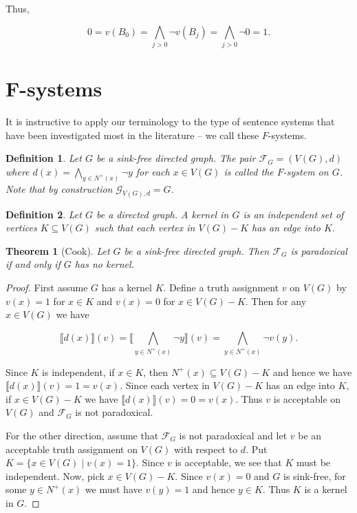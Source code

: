 \documentclass[12pt]{article}
\newtheorem{thm}{Theorem}
\newtheorem{defn}{Definition}
\theoremstyle{remark}
\newcommand{\fancy}[1]{\mathcal{#1}}
\def\G{\fancy{G}}
\def\F{\fancy{F}}
\def\F{\fancy{F}}
\begin{document}
Thus, 

\[0 = v(B_0) = \bigwedge_{j > 0} \neg v(B_j)= \bigwedge_{j > 0} \neg 0 = 1.\]


\appendix


\section{F-systems}
\label{app}

It is instructive to apply our terminology to the type of sentence systems that have been investigated most in the literature -- we call these $F$-systems.

\begin{defn}
Let $G$ be a sink-free directed graph.  The pair $\F_G = (V(G), d)$ where $d(x) = \bigwedge_{y \in N^+(x)} \neg y$ for each $x \in V(G)$ is called the \emph{$F$-system} on $G$.  Note that by construction $\G_{V(G), d} = G$.
\end{defn}

\begin{defn}
Let $G$ be a directed graph.  A \emph{kernel} in $G$ is an independent set of vertices $K \subseteq V(G)$ such that each vertex in $V(G) - K$ has an edge into $K$.
\end{defn}

\begin{thm}[Cook]
Let $G$ be a sink-free directed graph. Then $\F_G$ is paradoxical if and only if $G$ has no kernel.
\end{thm}
\begin{proof}
First assume $G$ has a kernel $K$.  Define a truth assignment $v$ on $V(G)$ by $v(x) = 1$ for $x \in K$ and $v(x) = 0$ for $x \in V(G) - K$.  Then for any $x \in V(G)$ we have

\[\llbracket d(x) \rrbracket(v) = \llbracket \bigwedge_{y \in N^+(x)} \neg y \rrbracket(v) = \bigwedge_{y \in N^+(x)} \neg v(y).\]

Since $K$ is independent, if $x \in K$, then $N^+(x) \subseteq V(G) - K$ and hence we have $\llbracket d(x) \rrbracket(v) = 1 = v(x)$.  Since each vertex in $V(G) - K$ has an edge into $K$, if $x \in V(G) - K$ we have $\llbracket d(x) \rrbracket(v) = 0 = v(x)$.  Thus $v$ is acceptable on $V(G)$ and $\F_G$ is not paradoxical.\newline

For the other direction, assume that $\F_G$ is not paradoxical and let $v$ be an acceptable truth assignment on $V(G)$ with respect to $d$.  Put $K = \{x \in V(G) \mid v(x) = 1\}$.  Since $v$ is acceptable, we see that $K$ must be independent.  Now, pick $x \in V(G) - K$.  Since $v(x) = 0$ and $G$ is sink-free, for some $y \in N^+(x)$ we must have $v(y) = 1$ and hence $y \in K$.  Thus $K$ is a kernel in $G$.
\end{proof}
\end{document}
